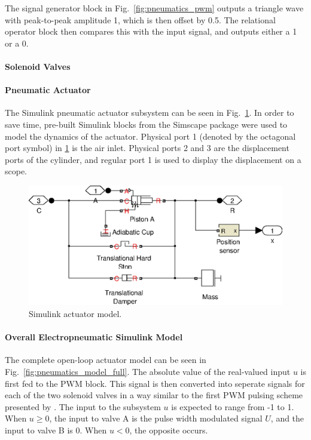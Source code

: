 The signal generator block in Fig.\ \ref{fig:pneumatics_pwm} outputs a triangle wave with peak-to-peak amplitude 1, which is then offset by 0.5. The relational operator block then compares this with the input signal, and outputs either a 1 or a 0.

\paragraph{Solenoid Valves}



\paragraph{Pneumatic Actuator}

The Simulink pneumatic actuator subsystem can be seen in Fig.\ \ref{fig:pneumatics_actuator}. In order to save time, pre-built Simulink blocks from the Simscape package were used to model the dynamics of the actuator. Physical port 1 (denoted by the octagonal port symbol) in \ref{fig:pneumatics_actuator} is the air inlet. Physical ports 2 and 3 are the displacement ports of the cylinder, and regular port 1 is used to display the displacement on a scope.

\begin{figure}[H]
\centering
\includegraphics[scale=0.65]{implementation/figures/pneumatic_modelling3}
\caption{Simulink actuator model.}
\label{fig:pneumatics_actuator}
\end{figure}

\paragraph{Overall Electropneumatic Simulink Model}

The complete open-loop actuator model can be seen in Fig.\ \ref{fig:pneumatics_model_full}. The absolute value of the real-valued input $u$ is first fed to the PWM block. This signal is then converted into seperate signals for each of the two solenoid valves in a way similar to the first PWM pulsing scheme presented by \citet{accurate_position}. The input to the subsystem $u$ is expected to range from -1 to 1. When $u\geq0$, the input to valve A is  the pulse width modulated signal $U$, and the input to valve B is 0. When $u<0$, the opposite occurs.

